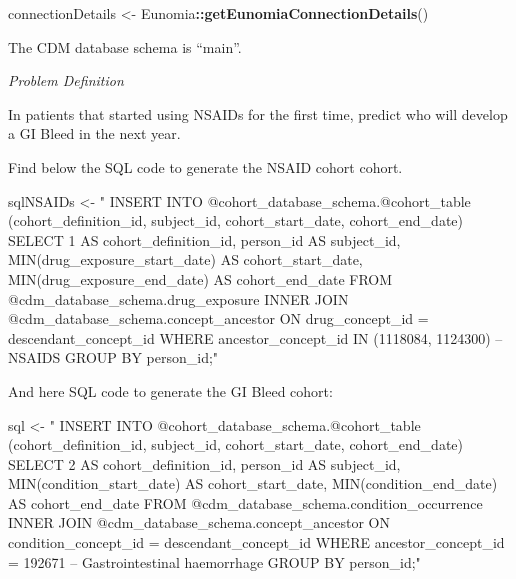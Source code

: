 \documentclass[11pt]{book}
\newenvironment{Shaded}{\begin{snugshade}}{\end{snugshade}}
\newcommand{\KeywordTok}[1]{\textcolor[rgb]{0.13,0.29,0.53}{\textbf{#1}}}
\newcommand{\NormalTok}[1]{#1}
\newcommand{\OperatorTok}[1]{\textcolor[rgb]{0.81,0.36,0.00}{\textbf{#1}}}
\newcommand{\StringTok}[1]{\textcolor[rgb]{0.31,0.60,0.02}{#1}}
\theoremstyle{definition}
\theoremstyle{definition}
\theoremstyle{definition}
\theoremstyle{remark}
\begin{document}
\begin{Shaded}
\begin{Highlighting}[]
\NormalTok{connectionDetails <-}\StringTok{ }\NormalTok{Eunomia}\OperatorTok{::}\KeywordTok{getEunomiaConnectionDetails}\NormalTok{()}
\end{Highlighting}
\end{Shaded}

The CDM database schema is ``main''.

\emph{Problem Definition}

In patients that started using NSAIDs for the first time, predict who will develop a GI Bleed in the next year.

Find below the SQL code to generate the NSAID cohort cohort.

\begin{Shaded}
\begin{Highlighting}[]
\NormalTok{sqlNSAIDs <-}\StringTok{ "}
\StringTok{INSERT INTO @cohort_database_schema.@cohort_table (cohort_definition_id, subject_id, cohort_start_date, cohort_end_date)}
\StringTok{SELECT 1 AS cohort_definition_id,}
\StringTok{  person_id AS subject_id,}
\StringTok{  MIN(drug_exposure_start_date) AS cohort_start_date,}
\StringTok{  MIN(drug_exposure_end_date) AS cohort_end_date}
\StringTok{FROM @cdm_database_schema.drug_exposure}
\StringTok{INNER JOIN @cdm_database_schema.concept_ancestor}
\StringTok{  ON drug_concept_id = descendant_concept_id}
\StringTok{WHERE ancestor_concept_id IN (1118084, 1124300) -- NSAIDS}
\StringTok{GROUP BY person_id;"}
\end{Highlighting}
\end{Shaded}

And here SQL code to generate the GI Bleed cohort:

\begin{Shaded}
\begin{Highlighting}[]
\NormalTok{sql <-}\StringTok{ "}
\StringTok{INSERT INTO @cohort_database_schema.@cohort_table (cohort_definition_id, subject_id, cohort_start_date, cohort_end_date)}
\StringTok{SELECT 2 AS cohort_definition_id,}
\StringTok{  person_id AS subject_id,}
\StringTok{  MIN(condition_start_date) AS cohort_start_date,}
\StringTok{  MIN(condition_end_date) AS cohort_end_date}
\StringTok{FROM @cdm_database_schema.condition_occurrence}
\StringTok{INNER JOIN @cdm_database_schema.concept_ancestor}
\StringTok{  ON condition_concept_id = descendant_concept_id}
\StringTok{WHERE ancestor_concept_id = 192671 -- Gastrointestinal haemorrhage}
\StringTok{GROUP BY person_id;"}
\end{Highlighting}
\end{Shaded}
\end{document}
